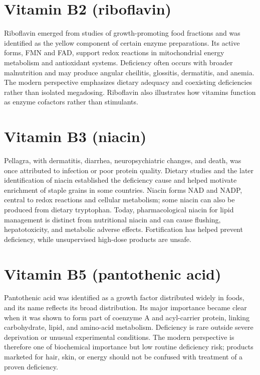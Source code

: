 \section{Vitamin B2 (riboflavin)}
Riboflavin emerged from studies of growth-promoting food fractions and was identified as the yellow component of certain enzyme preparations. Its active forms, FMN and FAD, support redox reactions in mitochondrial energy metabolism and antioxidant systems. Deficiency often occurs with broader malnutrition and may produce angular cheilitis, glossitis, dermatitis, and anemia. The modern perspective emphasizes dietary adequacy and coexisting deficiencies rather than isolated megadosing. Riboflavin also illustrates how vitamins function as enzyme cofactors rather than stimulants. \cite{historyNutrition,odsRiboflavin}

\section{Vitamin B3 (niacin)}
Pellagra, with dermatitis, diarrhea, neuropsychiatric changes, and death, was once attributed to infection or poor protein quality. Dietary studies and the later identification of niacin established the deficiency cause and helped motivate enrichment of staple grains in some countries. Niacin forms NAD and NADP, central to redox reactions and cellular metabolism; some niacin can also be produced from dietary tryptophan. Today, pharmacological niacin for lipid management is distinct from nutritional niacin and can cause flushing, hepatotoxicity, and metabolic adverse effects. Fortification has helped prevent deficiency, while unsupervised high-dose products are unsafe. \cite{historyNutrition,odsNiacin}

\section{Vitamin B5 (pantothenic acid)}
Pantothenic acid was identified as a growth factor distributed widely in foods, and its name reflects its broad distribution. Its major importance became clear when it was shown to form part of coenzyme A and acyl-carrier protein, linking carbohydrate, lipid, and amino-acid metabolism. Deficiency is rare outside severe deprivation or unusual experimental conditions. The modern perspective is therefore one of biochemical importance but low routine deficiency risk; products marketed for hair, skin, or energy should not be confused with treatment of a proven deficiency. \cite{historyNutrition,odsPantothenic}

